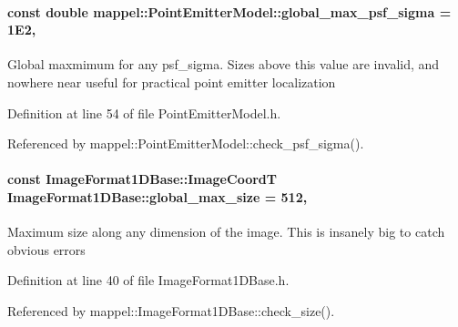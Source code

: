 \paragraph[{\texorpdfstring{global\+\_\+max\+\_\+psf\+\_\+sigma}{global_max_psf_sigma}}]{\setlength{\rightskip}{0pt plus 5cm}const double mappel\+::\+Point\+Emitter\+Model\+::global\+\_\+max\+\_\+psf\+\_\+sigma = 1\+E2\hspace{0.3cm}{\ttfamily [static]}, {\ttfamily [inherited]}}\hypertarget{classmappel_1_1PointEmitterModel_a5e79dba8966c25c4e9c675cd1a2cab70}{}\label{classmappel_1_1PointEmitterModel_a5e79dba8966c25c4e9c675cd1a2cab70}
Global maxmimum for any psf\+\_\+sigma. Sizes above this value are invalid, and nowhere near useful for practical point emitter localization 

Definition at line 54 of file Point\+Emitter\+Model.\+h.



Referenced by mappel\+::\+Point\+Emitter\+Model\+::check\+\_\+psf\+\_\+sigma().

\paragraph[{\texorpdfstring{global\+\_\+max\+\_\+size}{global_max_size}}]{\setlength{\rightskip}{0pt plus 5cm}const {\bf Image\+Format1\+D\+Base\+::\+Image\+CoordT} Image\+Format1\+D\+Base\+::global\+\_\+max\+\_\+size = 512\hspace{0.3cm}{\ttfamily [static]}, {\ttfamily [inherited]}}\hypertarget{classmappel_1_1ImageFormat1DBase_a5aafad20e635eae6f3609af56abad3ad}{}\label{classmappel_1_1ImageFormat1DBase_a5aafad20e635eae6f3609af56abad3ad}
Maximum size along any dimension of the image. This is insanely big to catch obvious errors 

Definition at line 40 of file Image\+Format1\+D\+Base.\+h.



Referenced by mappel\+::\+Image\+Format1\+D\+Base\+::check\+\_\+size().

